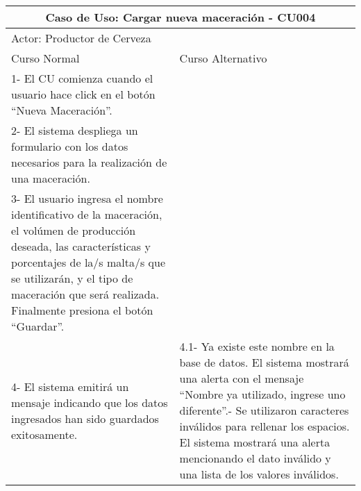     
    \begin{minipage}{0.95\textwidth}
    \begin{center}
    \begin{tabularx}{\textwidth}{ | X | X |}
        \hline
        \multicolumn{2}{|c|}{\textbf{Caso de Uso: Cargar nueva maceración - CU004}} \\
        \hline
        \multicolumn{2}{|l|}{Actor: Productor de Cerveza} \\
        \hline
        Curso Normal & Curso Alternativo \\
        \hline
        1- El CU comienza cuando el usuario hace click en el botón “Nueva Maceración”. & \\
        \hline
        2- El sistema despliega un formulario con los datos necesarios para la realización de una maceración. &
        \\
        \hline
        3- El usuario ingresa el nombre identificativo de la maceración, el volúmen de producción deseada, las características y porcentajes de la/s malta/s que se utilizarán, y el tipo de maceración que será realizada. Finalmente presiona el botón “Guardar”. &
        \\
        \hline
        4- El sistema emitirá un mensaje indicando que los datos ingresados han sido guardados exitosamente.  & 
        4.1- Ya existe este nombre en la base de datos. El sistema mostrará una alerta con el mensaje “Nombre ya utilizado, ingrese uno diferente”.\newline 4.2- Se utilizaron caracteres inválidos para rellenar los espacios. El sistema mostrará una alerta mencionando el dato inválido y una lista de los valores inválidos.
        \\
        \hline
    \end{tabularx}
    \label{CU004}
    \end{center}
    \end{minipage}
    
